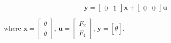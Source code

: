 \documentclass{article}
\begin{document}
\begin{equation}
\mathbf{y} = \begin{bmatrix} 0 & 1 \end{bmatrix} \mathbf{x} + \begin{bmatrix} 0 & 0 \end{bmatrix} \mathbf{u}
\end{equation}

where $\mathbf{x} = \begin{bmatrix} \theta \\ \dot{\theta} \end{bmatrix}$, $\mathbf{u} = \begin{bmatrix} F_2 \\ F_4 \end{bmatrix}$, $\mathbf{y} = [\dot{\theta}]$.

\vspace{0.5cm}
\end{document}
